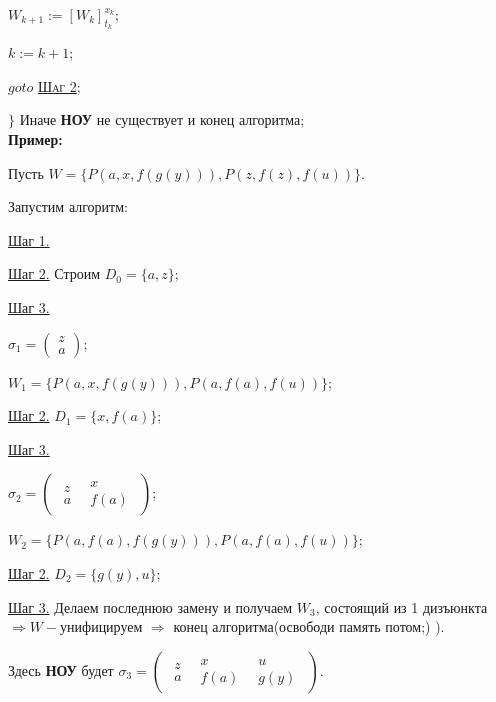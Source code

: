 \documentclass[18pt, a4paper]{extarticle}
\newcommand{\primer}{\textbf{Пример:\;}}
\newcommand{\sg}{\sigma}
\begin{document}
\qquad\qquad\qquad $W_{k+1}:=[W_k]^{x_k}_{t_k}$;

\qquad\qquad\qquad $k:=k+1$;

\qquad\qquad\qquad $goto$ \textsc{\underline{Шаг 2}};

\qquad\qquad $\}$ Иначе \textbf{НОУ} не существует и конец алгоритма;\\

\primer

Пусть $W=\{P(a,x,f(g(y))),P(z,f(z),f(u))\}$.

Запустим алгоритм:

\underline{Шаг 1.}

\underline{Шаг 2.} Строим $D_0=\{a,z\}$;

\underline{Шаг 3.}

$\sg_1=\begin{pmatrix}z\\a\end{pmatrix}$;

$W_1=\{P(a,x,f(g(y))),P(a,f(a),f(u))\}$;

\underline{Шаг 2.} $D_1=\{x,f(a)\}$;

\underline{Шаг 3.} 

$\sg_2=\begin{pmatrix}\begin{matrix}z\\a\end{matrix}\;\;\begin{matrix}x\\f(a)\end{matrix}\end{pmatrix}$;

$W_2=\{P(a,f(a),f(g(y))),P(a,f(a),f(u))\}$;

\underline{Шаг 2.} $D_2=\{g(y),u\}$;

\underline{Шаг 3.} Делаем последнюю замену и получаем $W_3$, состоящий из 1 дизъюнкта $\Rightarrow W-$унифицируем $\Rightarrow$ конец алгоритма(освободи память потом;) ).

Здесь \textbf{НОУ} будет $\sg_3=\begin{pmatrix}\begin{matrix}z\\a\end{matrix}\;\;\begin{matrix}x\\f(a)\end{matrix}\;\;\begin{matrix}u\\g(y)\end{matrix}\end{pmatrix}$.
\end{document}
